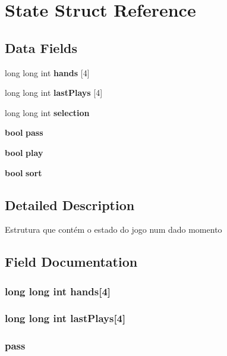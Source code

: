 \section{State Struct Reference}
\label{struct_state}
\subsection*{Data Fields}
\begin{DoxyCompactItemize}
\item 
long long int {\bf hands} [4]
\item 
long long int {\bf last\+Plays} [4]
\item 
long long int {\bf selection}
\item 
{\bf bool} {\bf pass}
\item 
{\bf bool} {\bf play}
\item 
{\bf bool} {\bf sort}
\end{DoxyCompactItemize}


\subsection{Detailed Description}
Estrutura que contém o estado do jogo num dado momento 

\subsection{Field Documentation}
\subsubsection[{hands}]{\setlength{\rightskip}{0pt plus 5cm}long long int hands[4]}\label{struct_state_adca1e2070b36e431a96082e7d7efb049}
\subsubsection[{last\+Plays}]{\setlength{\rightskip}{0pt plus 5cm}long long int last\+Plays[4]}\label{struct_state_a8fb09a3cbaf452577be5f0e8af63950e}
\subsubsection[{pass}]{ pass}\label{struct_state_a2d767829f56307840b3cf6e14dd195ff}
